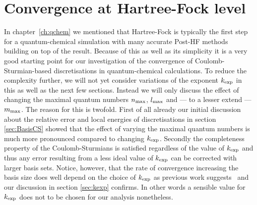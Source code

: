 \section{Convergence at Hartree-Fock level}
\label{sec:CSconvergenceHF}
In chapter~\vref{ch:qchem} we mentioned that Hartree-Fock
is typically the first step for a quantum-chemical simulation
with many accurate Post-HF methods building on top of the \HF result.
Because of this as well as its simplicity it is a very good
starting point for our investigation of the convergence
of Coulomb-Sturmian-based discretisations in quantum-chemical calculations.
To reduce the complexity further,
we will not yet consider variations of the \CS exponent $k_\text{exp}$ in this as well as
the next few sections.
Instead we will only discuss the effect of changing the maximal quantum numbers
$n_\text{max}$, $l_\text{max}$ and --- to a lesser extend --- $m_\text{max}$.
The reason for this is twofold.
First of all already our initial discussion
about the relative error and local energies of \CS discretisations
in section \vref{sec:BasisCS}
showed that the effect of varying the maximal quantum numbers
is much more pronounced compared to changing $k_\text{exp}$.
Secondly the completeness property of the Coulomb-Sturmians
is satisfied regardless of the value of $k_\text{exp}$
and thus any error resulting from a less ideal
value of $k_\text{exp}$ can be corrected with larger basis sets.
Notice, however,
that the rate of convergence increasing the basis size
does well depend on the choice of $k_\text{exp}$
as previous work suggests~\cite{Avery2017}
and our discussion in section \ref{sec:kexp} confirms.
In other words a sensible value for $k_\text{exp}$ does not to be chosen
for our analysis nonetheless.

